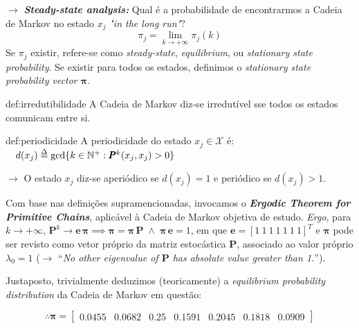 \noindent $\rightarrow$ \textbf{\textit{Steady-state analysis:}} Qual é a probabilidade de encontrarmos a Cadeia de Markov no estado $x_j$ \textit{"in the long run"\footnotemark[1]}? 
$$ \pi_j = \lim_{k\to+\infty} \pi_j(k) $$
Se $\pi_j$ existir, refere-se como \textit{steady-state}, \textit{equilibrium}, ou \textit{stationary
state probability}. Se existir para todos os estados, definimos o \textit{stationary state probability vector} $\pmb{\pi}$.

\begin{theo}{def:irredutibilidade}
    A Cadeia de Markov diz-se irredutível sse todos os estados comunicam entre si.
\end{theo}
\vspace{-0.5em}
\begin{theo}{def:periodicidade}
    A periodicidade do estado $x_j\in \mathcal{X}$ é: $\quad d(x_j) \delequal \gcd\{k\in\mathbb{N}^+: \pmb{P}^k(x_j,x_j)>0\} $
    
    \noindent$\rightarrow$ O estado $x_j$ diz-se aperiódico se $d(x_j)=1$ e periódico se $d(x_j)>1$.
\end{theo}
Com base nas definições supramencionadas, invocamos o \textit{\textbf{Ergodic Theorem for Primitive Chains}}\cite{MEDHI2003}, aplicável à Cadeia de Markov objetiva de estudo. \textit{Ergo}, para $k\to+\infty$, $  
\pmb{P}^k \to \pmb{e}\, \pmb{\pi} \implies \pmb{\pi} = \pmb{\pi}\, \pmb{P} \;\land\; \pmb{\pi}\, \pmb{e} = 1$, em que $\pmb{e} = [1\: 1\: 1\: 1\: 1\: 1\: 1]^T$ e $\pmb{\pi}$ pode ser revisto como vetor próprio da matriz estocástica $\pmb{P}$, associado ao valor próprio $\lambda_0 = 1$ ($\rightarrow$ ``\textit{No other eigenvalue of $\pmb{P}$ has absolute value greater than 1.}''\cite{Luenberger1979}).

Justaposto, trivialmente deduzimos (teoricamente) a \textit{equilibrium probability distribution} da Cadeia de Markov em questão:

$$ \therefore \pmb{\pi} = \begin{bmatrix} 0.0455 & 0.0682 & 0.25 & 0.1591 & 0.2045 & 0.1818 & 0.0909 \end{bmatrix} $$
